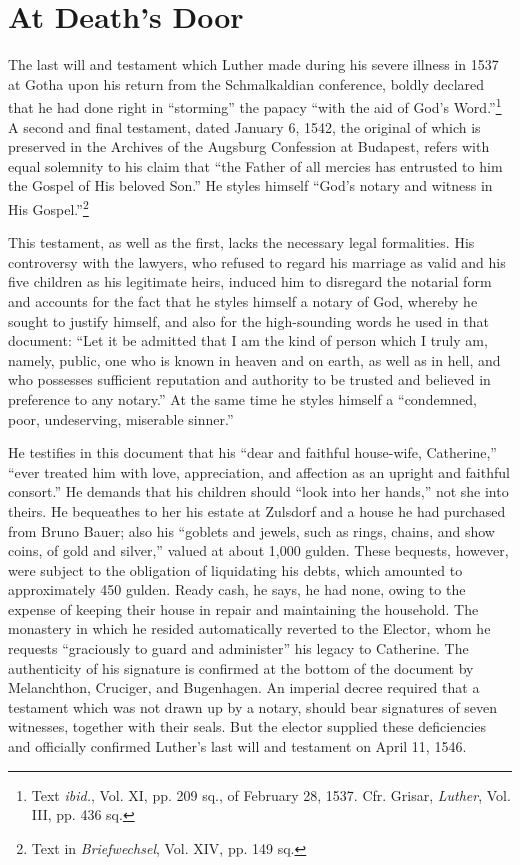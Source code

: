 \section{At Death’s Door}

The last will and testament which Luther made during his severe
illness in 1537 at Gotha upon his return from the Schmalkaldian conference,
boldly declared that he had done right in “storming” the
papacy “with the aid of God’s Word.”\footnote
{Text \textit{ibid.}, Vol. XI, pp. 209 sq., of February 28, 1537. Cfr. Grisar, \textit{Luther}, Vol. III,
pp. 436 sq.}
A second and final testament,
dated January 6, 1542, the original of which is preserved in the
Archives of the Augsburg Confession at Budapest, refers with equal
solemnity to his claim that “the Father of all mercies has entrusted
to him the Gospel of His beloved Son.” He styles himself “God’s notary
and witness in His Gospel.”\footnote{Text in \textit{Briefwechsel}, Vol. XIV, pp. 149 sq.}

This testament, as well as the first, lacks the necessary legal formalities.
His controversy with the lawyers, who refused to regard his
marriage as valid and his five children as his legitimate heirs, induced
him to disregard the notarial form and accounts for the fact that he
styles himself a notary of God, whereby he sought to justify himself,
and also for the high-sounding words he used in that document:
``Let it be admitted that I am the kind of person which I truly am,
namely, public, one who is known in heaven and on earth, as well
as in hell, and who possesses sufficient reputation and authority to
be trusted and believed in preference to any notary.” At the same
time he styles himself a “condemned, poor, undeserving, miserable
sinner.”

He testifies in this document that his “dear and faithful house-wife,
Catherine,” “ever treated him with love, appreciation, and affection
as an upright and faithful consort.” He demands that his children
should “look into her hands,” not she into theirs. He bequeathes to
her his estate at Zulsdorf and a house he had purchased from Bruno
Bauer; also his “goblets and jewels, such as rings, chains, and show
coins, of gold and silver,” valued at about 1,000 gulden. These bequests,
however, were subject to the obligation of liquidating his
debts, which amounted to approximately 450 gulden. Ready cash,
he says, he had none, owing to the expense of keeping their house
in repair and maintaining the household. The monastery in which he
resided automatically reverted to the Elector, whom he requests “graciously
to guard and administer” his legacy to Catherine. The
authenticity of his signature is confirmed at the bottom of the document
by Melanchthon, Cruciger, and Bugenhagen. An imperial decree required
that a testament which was not drawn up by a notary,
should bear signatures of seven witnesses, together with their seals.
But the elector supplied these deficiencies and officially confirmed
Luther’s last will and testament on April 11, 1546.

